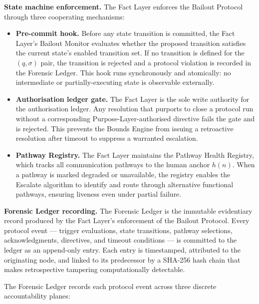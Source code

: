 \medskip\noindent
\textbf{State machine enforcement.} The Fact Layer enforces the Bailout Protocol through three cooperating mechanisms:

\begin{itemize}\itemsep=0pt
  \item[(\textit{i})] \textbf{Pre-commit hook.} Before any state transition is committed, the Fact Layer's Bailout Monitor evaluates whether the proposed transition satisfies the current state's enabled transition set. If no transition is defined for the $(q, \sigma)$ pair, the transition is rejected and a protocol violation is recorded in the Forensic Ledger. This hook runs synchronously and atomically: no intermediate or partially-executing state is observable externally.
  \item[(\textit{ii})] \textbf{Authorisation ledger gate.} The Fact Layer is the sole write authority for the authorisation ledger. Any resolution that purports to close a protocol run without a corresponding Purpose-Layer-authorised directive fails the gate and is rejected. This prevents the Bounds Engine from issuing a retroactive resolution after timeout to suppress a warranted escalation.
  \item[(\textit{iii})] \textbf{Pathway Registry.} The Fact Layer maintains the Pathway Health Registry, which tracks all communication pathways to the human anchor $h(n)$. When a pathway is marked degraded or unavailable, the registry enables the Escalate algorithm to identify and route through alternative functional pathways, ensuring liveness even under partial failure.
\end{itemize}

\medskip\noindent
\textbf{Forensic Ledger recording.} The Forensic Ledger is the immutable evidentiary record produced by the Fact Layer's enforcement of the Bailout Protocol. Every protocol event — trigger evaluations, state transitions, pathway selections, acknowledgments, directives, and timeout conditions — is committed to the ledger as an append-only entry. Each entry is timestamped, attributed to the originating node, and linked to its predecessor by a SHA-256 hash chain that makes retrospective tampering computationally detectable.

The Forensic Ledger records each protocol event across three discrete accountability planes:

